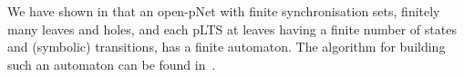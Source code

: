\documentclass{lmcs}
\newcommand{\TODO}[1]{\textcolor{red}{\textbf{[TODO:#1]}}}
\newtheorem{algorithm}[theorem]{Algorithm}
\begin{document}
%
%
%
%
% 
%
%

We have shown in \cite{henrio:Forte2016} that an open-pNet
with finite synchronisation sets, finitely many leaves and
holes, and each pLTS at leaves having a finite number of states and
(symbolic) transitions, has a finite automaton. The algorithm for building such an automaton can be found in~\cite{QBMZ-AVOCS18}.


\end{document}
